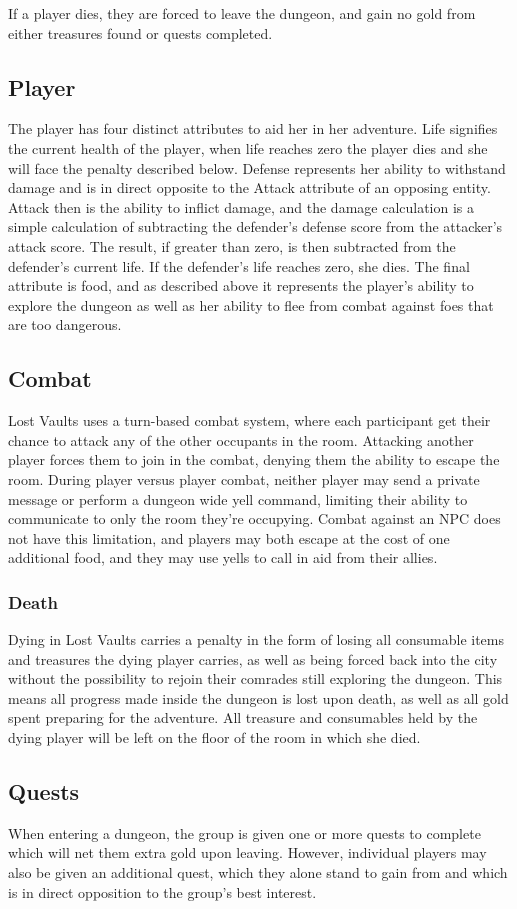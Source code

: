 \documentclass[a4paper]{article}
\begin{document}
If a player dies, they are forced to leave the dungeon, and gain no gold from either treasures found or quests completed.
\subsection{Player}
The player has four distinct attributes to aid her in her adventure. Life signifies the current health of the player, when life reaches zero the player dies and she will face the penalty 
described below. Defense represents her ability to withstand damage and is in direct opposite to the Attack attribute of an opposing entity. Attack then is the ability to inflict damage, 
and the damage calculation is a simple calculation of subtracting the defender's defense score from the attacker's attack score. The result, if greater than zero, is then subtracted from 
the defender's current life. If the defender's life reaches zero, she dies. The final attribute is food, and as described above it represents the player's ability to explore the dungeon 
as well as her ability to flee from combat against foes that are too dangerous. 
\subsection{Combat}
Lost Vaults uses a turn-based combat system, where each participant get their chance to attack any of the other occupants in the room. Attacking another player forces them to join in the 
combat, denying them the ability to escape the room. During player versus player combat, neither player may send a private message or perform a dungeon wide yell command, limiting their 
ability to communicate to only the room they're occupying. Combat against an NPC does not have this limitation, and players may both escape at the cost of one additional food, and they 
may use yells to call in aid from their allies.
\subsubsection{Death}
Dying in Lost Vaults carries a penalty in the form of losing all consumable items and treasures the dying player carries, as well as being forced back into the city without the possibility 
to rejoin their comrades still exploring the dungeon. This means all progress made inside the dungeon is lost upon death, as well as all gold spent preparing for the adventure. All treasure 
and consumables held by the dying player will be left on the floor of the room in which she died.
\subsection{Quests}
When entering a dungeon, the group is given one or more quests to complete which will net them extra gold upon leaving. However, individual players may also be given an additional quest, 
which they alone stand to gain from and which is in direct opposition to the group's best interest.
\end{document}
